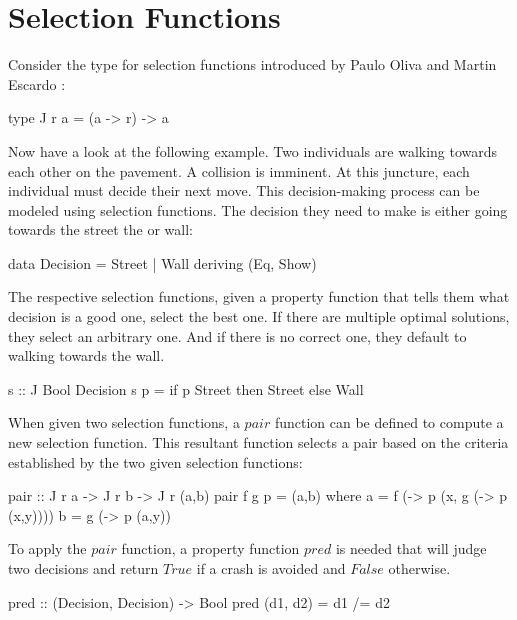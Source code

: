 \documentclass[runningheads]{llncs}
\begin{document}
\section{Selection Functions}\label{selection-functions}

Consider the type for selection functions introduced by Paulo Oliva and
Martin Escardo \cite{escardo2010selection} :

\begin{code}
type J r a = (a -> r) -> a
\end{code}

Now have a look at the following example. Two individuals are walking
towards each other on the pavement. A collision is imminent. At this
juncture, each individual must decide their next move. This
decision-making process can be modeled using selection functions. The
decision they need to make is either going towards the street the or
wall:

\begin{code}
data Decision = Street | Wall deriving (Eq, Show)
\end{code}

The respective selection functions, given a property function that tells
them what decision is a good one, select the best one. If there are
multiple optimal solutions, they select an arbitrary one. And if there
is no correct one, they default to walking towards the wall.

\begin{code}
s :: J Bool Decision
s p = if p Street then Street else Wall
\end{code}

When given two selection functions, a \(pair\) function can be defined
to compute a new selection function. This resultant function selects a
pair based on the criteria established by the two given selection
functions:

\begin{code}
pair :: J r a -> J r b -> J r (a,b)
pair f g p = (a,b)
  where
      a = f (\x -> p (x, g (\y -> p (x,y))))
      b = g (\y -> p (a,y))
\end{code}

To apply the \(pair\) function, a property function \(pred\) is needed
that will judge two decisions and return \(True\) if a crash is avoided
and \(False\) otherwise.

\begin{code}
pred :: (Decision, Decision) -> Bool
pred (d1, d2) = d1 /= d2
\end{code}
\end{document}
